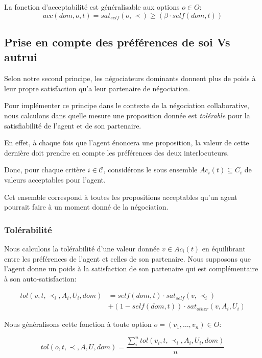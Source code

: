 	
	
	La fonction d'acceptabilité est généralisable aux options $o \in O$:
	 $$acc(dom,o, t) = sat_{self}(o, \prec) \geq  (\beta \cdot self(dom,t))$$

	
	\subsection {Prise en compte des préférences de soi Vs autrui}
	Selon notre second principe, les négociateurs dominants donnent plus de poids à leur propre satisfaction qu'a leur partenaire de négociation. 
	
	Pour implémenter ce principe dans le contexte de la négociation collaborative, nous calculons dans quelle mesure une proposition donnée est \emph{tolérable} pour la satisfiabilité de l'agent et de son partenaire.
	
	En effet, à chaque fois que l'agent énoncera une proposition, la valeur de cette dernière doit prendre en compte les préférences des deux interlocuteurs. 
	
	Donc, pour chaque critère $i\in \mathcal{C}$, considérons le sous ensemble $Ac_i(t)\subseteq C_i$ de valeurs acceptables pour l'agent.
	
	Cet ensemble correspond à toutes les propositions acceptables qu'un agent pourrait faire à un moment donné de la négociation.
	
	\subsubsection{Tolérabilité}
	
	Nous calculons la tolérabilité d'une valeur donnée $ v \in Ac_i(t) $ en équilibrant entre les préférences de l'agent et celles de son partenaire. Nous supposons que l'agent donne un poids à la satisfaction de son partenaire qui est complémentaire à son auto-satisfaction:


	\begin{equation}
	\begin{split}
	tol(v, t, \prec_i, A_i, U_i, dom) & = self(dom, t)  \cdot sat_{self}(v, \prec_i) \\
	& +  (1 - self(dom, t)) \cdot sat_{other}(v, A_i, U_i)
	\end{split} 
	\end{equation}
	

	Nous généralisons cette fonction à toute option 
	$o = (v_1,\ldots,v_n) \in O$:
	
	\begin{equation}
	tol(o, t, \prec, A, U, dom) = \frac{ \sum_{i}^{n} tol(v_i, t, \prec_i, A_i, U_i, dom) } {n}
	\end{equation}
	
